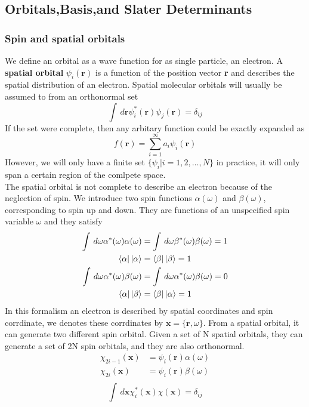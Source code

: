 \documentclass[11pt]{article}
\begin{document}
\subsection{Orbitals,Basis,and Slater Determinants}
\subsubsection{Spin and spatial orbitals}
We define an orbital as a wave function for as single particle, an electron. A \textbf{spatial orbital} $\psi_i(\mathbf{r})$
is a function of the position vector \textbf{r} and describes the spatial distribution of an electron. Spatial 
molecular orbitals will usually be assumed to from an orthonormal set
\begin{equation}
    \int\,d\mathbf{r}\psi_i^*(\mathbf{r})\psi_j(\mathbf{r})=\delta_{ij} 
\end{equation}
If the set were complete, then any  arbitary function could be exactly expanded as
\begin{equation}
    f(\mathbf{r})=\sum_{i=1}^{\infty}a_i\psi_i(\mathbf{r})
\end{equation}
However, we will only have a finite set $\{\psi_i|i=1,2,\ldots,N\}$ in practice, it will only span a certain region of the comlpete space.
\\The spatial orbital is not complete to describe an electron because of
the neglection of spin. We introduce two spin functions $\alpha(\omega)$ and $\beta(\omega)$, corresponding
to spin up and down. They are functions of an unspecified spin variable $\omega$ and they satisfy
\begin{equation}
    \begin{split}
        \int\,d{\omega}\alpha^*(\omega)\alpha(\omega)&=\int\,d{\omega}\beta^*(\omega)\beta(\omega)=1\\
        \bra{\alpha}\ket{\alpha}&=\bra{\beta}\ket{\beta}=1\\
        \int\,d{\omega}\alpha^*(\omega)\beta(\omega)&=\int\,d{\omega}\alpha^*(\omega)\beta(\omega)=0\\
        \bra{\alpha}\ket{\beta}&=\bra{\beta}\ket{\alpha}=1\\
    \end{split}
\end{equation}
In this formalism an electron is described by spatial coordinates and spin corrdinate, we denotes
these corrdinates by $\mathbf{x}=\{\mathbf{r},\omega\}$. From a spatial orbital, it can generate two
different spin orbital. Given a set of N spatial orbitals, they can generate a set of 2N spin orbitals, and
they are also orthonormal.
\begin{equation}
    \begin{split}
        \chi_{2i-1}(\mathbf{x})&=\psi_i(\mathbf{r})\alpha(\omega)\\
        \chi_{2i}(\mathbf{x})&=\psi_i(\mathbf{r})\beta(\omega)\\
    \end{split}
\end{equation}
\begin{equation}
    \int\,d\mathbf{x}\chi_i^*(\mathbf{x})\chi(\mathbf{x})=\delta_{ij} 
\end{equation}
\end{document}
